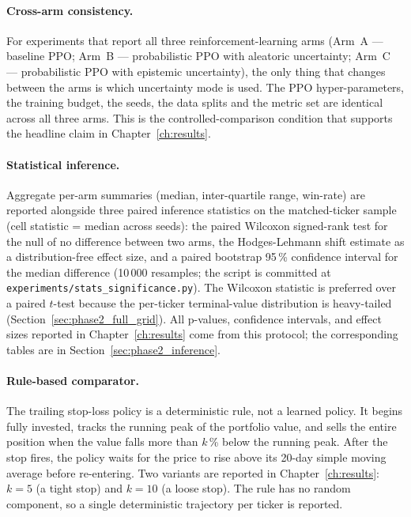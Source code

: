 \paragraph{Cross-arm consistency.} For experiments that report all three reinforcement-learning arms (Arm~A --- baseline PPO; Arm~B --- probabilistic PPO with aleatoric uncertainty; Arm~C --- probabilistic PPO with epistemic uncertainty), the only thing that changes between the arms is which uncertainty mode is used. The PPO hyper-parameters, the training budget, the seeds, the data splits and the metric set are identical across all three arms. This is the controlled-comparison condition that supports the headline claim in Chapter~\ref{ch:results}.

\paragraph{Statistical inference.} Aggregate per-arm summaries (median, inter-quartile range, win-rate) are reported alongside three paired inference statistics on the matched-ticker sample (cell statistic = median across seeds): the paired Wilcoxon signed-rank test for the null of no difference between two arms, the Hodges-Lehmann shift estimate as a distribution-free effect size, and a paired bootstrap 95\,\% confidence interval for the median difference (10\,000 resamples; the script is committed at \texttt{experiments/stats\_significance.py}). The Wilcoxon statistic is preferred over a paired $t$-test because the per-ticker terminal-value distribution is heavy-tailed (Section~\ref{sec:phase2_full_grid}). All p-values, confidence intervals, and effect sizes reported in Chapter~\ref{ch:results} come from this protocol; the corresponding tables are in Section~\ref{sec:phase2_inference}.

\paragraph{Rule-based comparator.} \label{sec:rule_based_comparator} The trailing stop-loss policy is a deterministic rule, not a learned policy. It begins fully invested, tracks the running peak of the portfolio value, and sells the entire position when the value falls more than $k$\,\% below the running peak. After the stop fires, the policy waits for the price to rise above its 20-day simple moving average before re-entering. Two variants are reported in Chapter~\ref{ch:results}: $k = 5$ (a tight stop) and $k = 10$ (a loose stop). The rule has no random component, so a single deterministic trajectory per ticker is reported.
